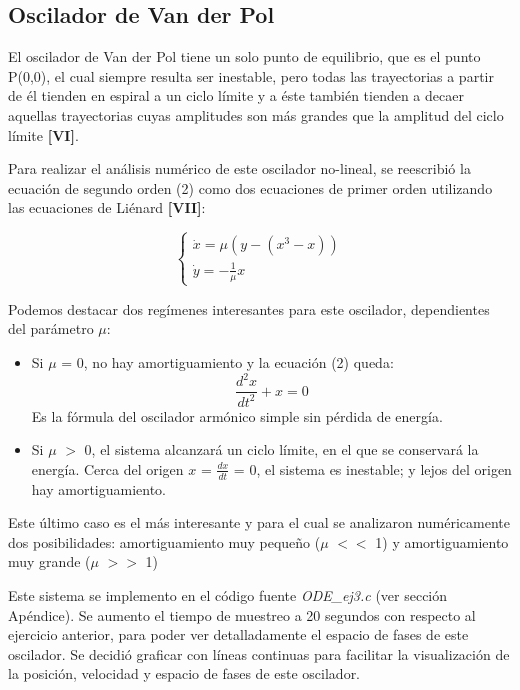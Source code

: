 \documentclass[a4paper,12pt]{article}
\begin{document}
\subsection{Oscilador de Van der Pol}

El oscilador de Van der Pol tiene un solo punto de equilibrio, que es el punto P(0,0), el cual siempre resulta ser inestable, pero todas las trayectorias a partir de \'el tienden en espiral a un ciclo l\'imite y a \'este tambi\'en tienden a decaer aquellas trayectorias cuyas amplitudes son m\'as grandes que la amplitud del ciclo l\'imite \textbf{[VI]}.

Para realizar el an\'alisis num\'erico de este oscilador no-lineal, se reescribi\'o la ecuaci\'on de segundo orden (2) como dos ecuaciones de primer orden utilizando las ecuaciones de Li\'enard \textbf{[VII]}:

$$ \begin{cases} \dot{x} = \mu (y-(x^3-x)) \\ \dot{y} = -\frac{1}{\mu}x \end{cases} $$

Podemos destacar dos reg\'imenes interesantes para este oscilador, dependientes del par\'ametro $\mu$:

\begin{itemize}
\item Si $\mu$ = 0, no hay amortiguamiento y la ecuaci\'on (2) queda:
$$ \frac{d^2 x}{dt^2} + x = 0 $$
Es la f\'ormula del oscilador arm\'onico simple sin p\'erdida de energ\'ia.
\item Si $\mu$ $>$ 0, el sistema alcanzar\'a un ciclo l\'imite, en el que se conservar\'a la energ\'ia. Cerca del origen $x$ = $\frac{dx}{dt}$ = 0, el sistema es inestable; y lejos del origen hay amortiguamiento.
\end{itemize}

Este \'ultimo caso es el m\'as interesante y para el cual se analizaron num\'ericamente dos posibilidades: amortiguamiento muy peque\~no ($\mu$ $<<$ 1) y amortiguamiento muy grande ($\mu$ $>>$ 1)

Este sistema se implemento en el c\'odigo fuente \textit{ODE\_ej3.c} (ver secci\'on Ap\'endice). Se aumento el tiempo de muestreo a 20 segundos con respecto al ejercicio anterior, para poder ver detalladamente el espacio de fases de este oscilador.
Se decidi\'o graficar con l\'ineas continuas para facilitar la visualizaci\'on de la posici\'on, velocidad y espacio de fases de este oscilador.
\end{document}
